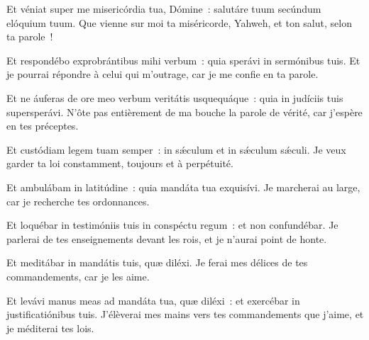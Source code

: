 \begin{paracol}{2}

\LigneParacol{0cm}
{Et véniat super me misericórdia tua, Dómine~: \GreStar{} salutáre tuum secúndum elóquium tuum.}
{Que vienne sur moi ta miséricorde, Yahweh, et ton salut, selon ta parole~!}

\LigneParacol{0.2cm}
{Et respondébo exprobrántibus mihi verbum~: \GreStar{} quia sperávi in sermónibus tuis.}
{Et je pourrai répondre à celui qui m'outrage, car je me confie en ta parole.}

\LigneParacol{0.2cm}
{Et ne áuferas de ore meo verbum veritátis usquequáque~: \GreStar{} quia in judíciis tuis supersperávi.}
{N'ôte pas entièrement de ma bouche la parole de vérité, car j'espère en tes préceptes.}

\LigneParacol{0.2cm}
{Et custódiam legem tuam semper~: \GreStar{} in sǽculum et in sǽculum sǽculi.}
{Je veux garder ta loi constamment, toujours et à perpétuité.}

\LigneParacol{0.2cm}
{Et ambulábam in latitúdine~: \GreStar{} quia mandáta tua exquisívi.}
{Je marcherai au large, car je recherche tes ordonnances.}

\LigneParacol{0.2cm}
{Et loquébar in testimóniis tuis in conspéctu regum~: \GreStar{} et non confundébar.}
{Je parlerai de tes enseignements devant les rois, et je n'aurai point de honte.}

\LigneParacol{0.2cm}
{Et meditábar in mandátis tuis, \GreStar{} quæ diléxi.}
{Je ferai mes délices de tes commandements, car je les aime.}

\LigneParacol{0.2cm}
{Et levávi manus meas ad mandáta tua, quæ diléxi~: \GreStar{} et exercébar in justificatiónibus tuis.}
{J'élèverai mes mains vers tes commandements que j'aime, et je méditerai tes lois. }

\end{paracol}
\Gloria
